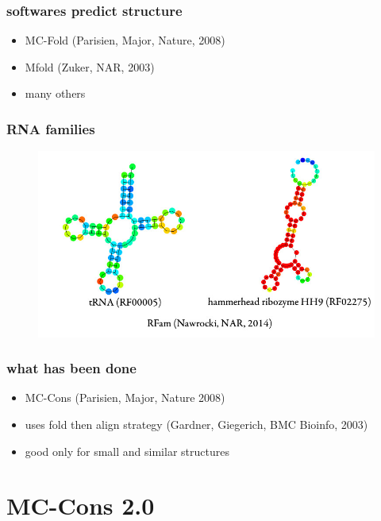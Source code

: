 \documentclass{beamer}
\begin{document}
\begin{frame}
	\frametitle{softwares predict structure}

	\begin{itemize}
		\item MC-Fold (Parisien, Major, Nature, 2008)
		\item Mfold (Zuker, NAR, 2003)
		\item many others
	\end{itemize}
\end{frame}


\begin{frame}
	\frametitle{RNA families}
	\begin{figure}
	\centering
	\includegraphics[scale=0.43]{figs/rfam}
	\end{figure}
\end{frame}


\begin{frame}

	\frametitle{what has been done}
	
	\begin{itemize}
		\item MC-Cons (Parisien, Major, Nature 2008)
		\item uses fold then align strategy (Gardner, Giegerich, BMC Bioinfo, 2003)
		\item good only for small and similar structures
	\end{itemize}
\end{frame}






\section{MC-Cons 2.0}
\end{document}
